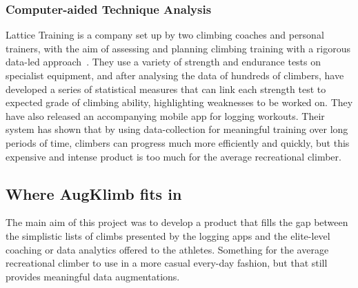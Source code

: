 \subsubsection{Computer-aided Technique Analysis}
Lattice Training is a company set up by two climbing coaches and personal trainers, with the aim of assessing and planning climbing training with a rigorous data-led approach~\cite{lattice}.
They use a variety of strength and endurance tests on specialist equipment, and after analysing the data of hundreds of climbers, have developed a series of statistical measures that can link each strength test to expected grade of climbing ability, highlighting weaknesses to be worked on.
They have also released an accompanying mobile app for logging workouts. 
Their system has shown that by using data-collection for meaningful training over long periods of time,  climbers can progress much more efficiently and quickly, but this expensive and intense product is too much for the average recreational climber.



\subsection{Where AugKlimb fits in}
The main aim of this project was to develop a product that fills the gap between the simplistic lists of climbs presented by the logging apps and the elite-level coaching or data analytics offered to the athletes.
Something for the average recreational climber to use in a more casual every-day fashion, but that still provides meaningful data augmentations.











